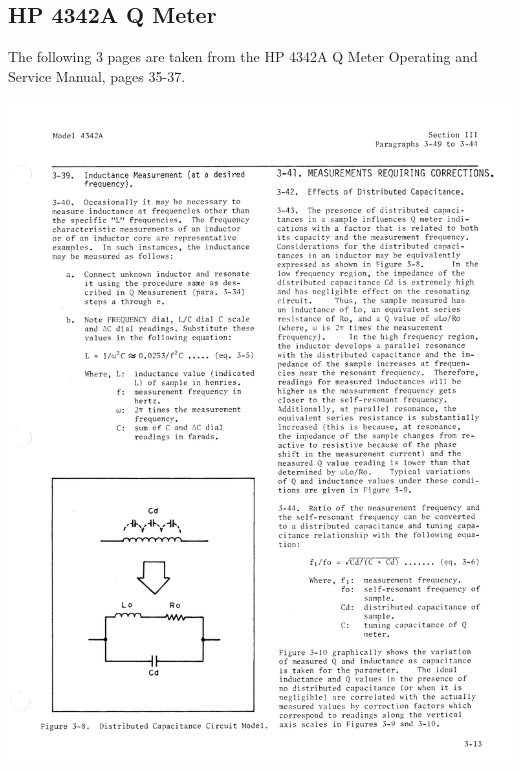 \documentclass[titlepage, letterpaper, 11pt]{article}
\begin{document}
\subsection{HP 4342A Q Meter}
\label{qMeter}

The following 3 pages are taken from the HP 4342A Q Meter Operating
and Service Manual, pages 35-37.

\clearpage
\includegraphics[width=1\textwidth]{qMeter/page35}
\end{document}
